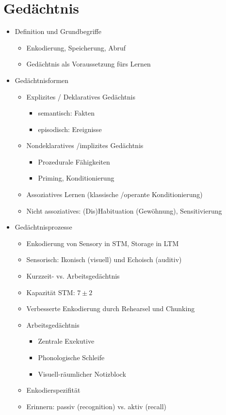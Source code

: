 \documentclass[11pt, paper=a4, twocolumn]{scrartcl}
\begin{document}
	\section{Gedächtnis}

	\begin{itemize}
		\item Definition und Grundbegriffe
			\begin{itemize}
				\item Enkodierung, Speicherung, Abruf
				\item Gedächtnis als Voraussetzung fürs Lernen
			\end{itemize}

		\item Gedächtnisformen
			\begin{itemize}
				\item Explizites / Deklaratives Gedächtnis
					\begin{itemize}
						\item semantisch: Fakten
						\item episodisch: Ereignisse
					\end{itemize}
				\item Nondeklaratives /implizites Gedächtnis
					\begin{itemize}
						\item Prozedurale Fähigkeiten
						\item Priming, Konditionierung
					\end{itemize}
				\item Assoziatives Lernen (klassische /operante 
					Konditionierung)
				\item Nicht assoziatives: (Dis)Habituation (Gewöhnung), 
					Sensitivierung
			\end{itemize}

		\item Gedächtnisprozesse
			\begin{itemize}
				\item Enkodierung von Sensory in STM, Storage in LTM
				\item Sensorisch: Ikonisch (visuell) und Echoisch 
					(auditiv)
				\item Kurzzeit- vs. Arbeitsgedächtnis
				\item Kapazität STM: $7\pm2$
				\item Verbesserte Enkodierung durch Rehearsel und Chunking
				\item Arbeitsgedächtnis
					\begin{itemize}
						\item Zentrale Exekutive
						\item Phonologische Schleife
						\item Visuell-räumlicher Notizblock
					\end{itemize}
				\item Enkodierspezifität
				\item Erinnern: passiv (recognition) vs. aktiv (recall)
			\end{itemize}


\end{itemize}
\end{document}
